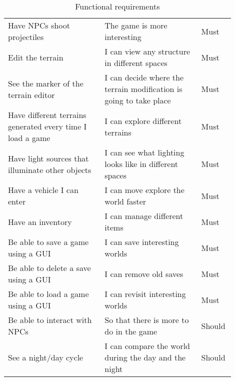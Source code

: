 \begin{table}[!htb]
\begin{tabular}{|p{0.4\linewidth}|p{0.4\linewidth}|p{0.1\linewidth}|}
        Have NPCs shoot projectiles                                & The game is more interesting                                       & Must           \\
        Edit the terrain                                           & I can view any structure in different spaces                       & Must           \\
        See the marker of the terrain editor                       & I can decide where the terrain modification is going to take place & Must           \\
        Have different terrains generated every time I load a game & I can explore different terrains                                   & Must           \\
        Have light sources that illuminate other objects           & I can see what lighting looks like in different spaces             & Must           \\
        Have a vehicle I can enter                                 & I can move explore the world faster                                & Must           \\
        Have an inventory                                          & I can manage different items                                       & Must           \\
        Be able to save a game using a GUI                         & I can save interesting worlds                                      & Must           \\
        Be able to delete a save using a GUI                       & I can remove old saves                                             & Must           \\
        Be able to load a game using a GUI                         & I can revisit interesting worlds                                   & Must           \\
        Be able to interact with NPCs                              & So that there is more to do in the game                            & Should         \\
        See a night/day cycle                                      & I can compare the world during the day and the night               & Should         \\
        \hline
    \end{tabular}
    \caption{Functional requirements}
    \label{tab:functional_requirements}
\end{table}